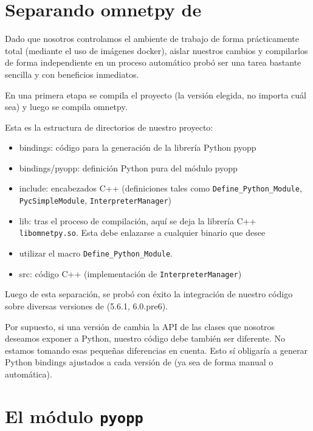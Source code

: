 \section{Separando omnetpy de \omnetpp{}}

Dado que nosotros controlamos el ambiente de trabajo de forma prácticamente
total (mediante el uso de imágenes docker), aislar nuestros cambios y
compilarlos de forma independiente en un proceso automático probó ser una tarea
bastante sencilla y con beneficios inmediatos.

En una primera etapa se compila el proyecto \omnetpp{} (la versión elegida, no
importa cuál sea) y luego se compila omnetpy.

Esta es la estructura de directorios de nuestro proyecto:

\begin{itemize}
    \item bindings: código para la generación de la librería Python pyopp

    \item bindings/pyopp: definición Python pura del módulo pyopp

    \item include: encabezados C++ (definiciones tales como
    \verb!Define_Python_Module!, \linebreak \verb!PycSimpleModule!,
    \verb!InterpreterManager!)

    \item lib: tras el proceso de compilación, aquí se deja la librería C++
\verb!libomnetpy.so!. Esta debe enlazarse a cualquier binario que desee
    \item utilizar el macro \verb!Define_Python_Module!.

    \item src: código C++ (implementación de \verb!InterpreterManager!)
\end{itemize}

Luego de esta separación, se probó con éxito la integración de nuestro código
sobre diversas versiones de \omnetpp{} (5.6.1, 6.0.pre6).

Por supuesto, si una versión de \omnetpp{} cambia la API de las clases que
nosotros deseamos exponer a Python, nuestro código debe también ser diferente.
No estamos tomando esas pequeñas diferencias en cuenta. Esto sí obligaría a
generar Python bindings ajustados a cada versión de \omnetpp{} (ya sea de forma
manual o automática).

\section{El módulo \texttt{pyopp}}

